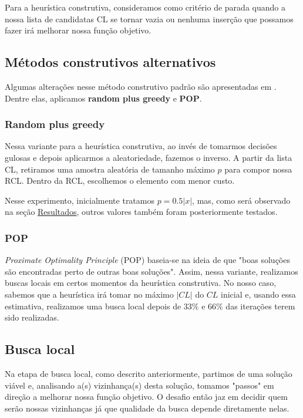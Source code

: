 \documentclass[11pt]{article}
\begin{document}
Para a heurística construtiva, consideramos como critério de parada quando a nossa lista de candidatas CL se tornar vazia ou nenhuma inserção que possamos fazer irá melhorar nossa função objetivo.

\subsection*{Métodos construtivos alternativos}
\label{sec:org49def5d}
Algumas alterações nesse método construtivo padrão são apresentadas em \cite{rezende19_grasp}. Dentre elas, aplicamos \textbf{random plus greedy} e \textbf{POP}.

\subsubsection*{Random plus greedy}
\label{sec:orgaf8c61c}
Nessa variante para a heurística construtiva, ao invés de tomarmos decisões gulosas e depois aplicarmos a aleatoriedade, fazemos o inverso. A partir da lista CL, retiramos uma amostra aleatória de tamanho máximo \(p\) para compor nossa RCL. Dentro da RCL, escolhemos o elemento com menor custo.

Nesse experimento, inicialmente tratamos \(p =0.5|x|\), mas, como será observado na seção \hyperref[sec:org01ea080]{Resultados}, outros valores também foram posteriormente testados.

\subsubsection*{POP}
\label{sec:org8f1cac4}
\emph{Proximate Optimality Principle} (POP) baseia-se na ideia de que "boas soluções são encontradas perto de outras boas soluções". Assim, nessa variante, realizamos buscas locais em certos momentos da heurística construtiva. No nosso caso, sabemos que a heurística irá tomar no máximo \(|CL|\) do \(CL\) inicial e, usando essa estimativa, realizamos uma busca local depois de \(33\%\) e \(66\%\) das iterações terem sido realizadas.
\subsection*{Busca local}
\label{sec:orgff5d321}
Na etapa de busca local, como descrito anteriormente, partimos de uma solução viável e, analisando a(s) vizinhança(s) desta solução, tomamos "passos" em direção a melhorar nossa função objetivo. O desafio então jaz em decidir quem serão nossas vizinhanças já que qualidade da busca depende diretamente nelas.
\end{document}
